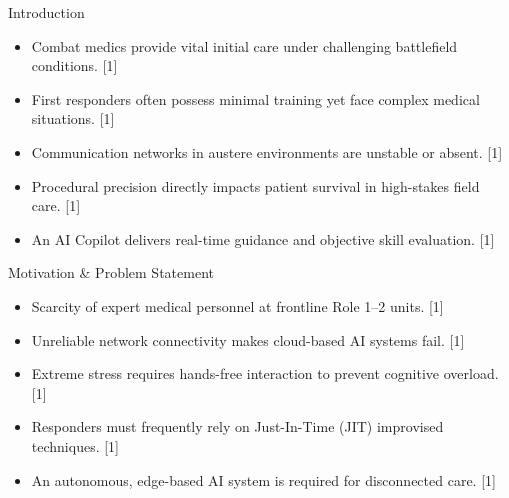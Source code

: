 \documentclass[aspectratio=169, 10pt]{beamer}
\begin{document}
\begin{frame}{Introduction}
    \vspace{0.3cm}
    \begin{itemize}
        \setlength{\itemsep}{8pt}
        \item Combat medics provide vital initial care under challenging battlefield conditions. [1]
        \item First responders often possess minimal training yet face complex medical situations. [1]
        \item Communication networks in austere environments are unstable or absent. [1]
        \item Procedural precision directly impacts patient survival in high-stakes field care. [1]
        \item An AI Copilot delivers real-time guidance and objective skill evaluation. [1]
    \end{itemize}
\end{frame}

\begin{frame}{Motivation \& Problem Statement}
    \vspace{0.3cm}
    \begin{itemize}
        \setlength{\itemsep}{8pt}
        \item Scarcity of expert medical personnel at frontline Role 1--2 units. [1]
        \item Unreliable network connectivity makes cloud-based AI systems fail. [1]
        \item Extreme stress requires hands-free interaction to prevent cognitive overload. [1]
        \item Responders must frequently rely on Just-In-Time (JIT) improvised techniques. [1]
        \item An autonomous, edge-based AI system is required for disconnected care. [1]
    \end{itemize}
\end{frame}
\end{document}
